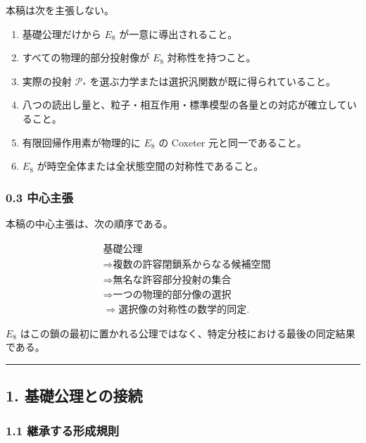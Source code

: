 \documentclass[
  a4paper,
  ja=minimal,
  xelatex,
  paragraph-mark={},
]{bxjsarticle}
\providecommand{\tightlist}{%
  \setlength{\itemsep}{0pt}\setlength{\parskip}{0pt}}
\begin{document}
本稿は次を主張しない。

\begin{enumerate}
\def\labelenumi{\arabic{enumi}.}
\tightlist
\item
  基礎公理だけから \(E_8\) が一意に導出されること。
\item
  すべての物理的部分投射像が \(E_8\) 対称性を持つこと。
\item
  実際の投射 \(\mathcal P_*\)
  を選ぶ力学または選択汎関数が既に得られていること。
\item
  八つの読出し量と、粒子・相互作用・標準模型の各量との対応が確立していること。
\item
  有限回帰作用素が物理的に \(E_8\) の Coxeter 元と同一であること。
\item
  \(E_8\) が時空全体または全状態空間の対称性であること。
\end{enumerate}

\subsubsection{0.3 中心主張}\label{ux4e2dux5fc3ux4e3bux5f35}

本稿の中心主張は、次の順序である。

\[
\boxed{
\begin{aligned}
&\text{基礎公理}\\
&\Longrightarrow
\text{複数の許容閉鎖系からなる候補空間}\\
&\Longrightarrow
\text{無名な許容部分投射の集合}\\
&\Longrightarrow
\text{一つの物理的部分像の選択}\\
&\Longrightarrow
\text{選択像の対称性の数学的同定}.
\end{aligned}
}
\]

\(E_8\)
はこの鎖の最初に置かれる公理ではなく、特定分枝における最後の同定結果である。

\begin{center}\rule{0.5\linewidth}{0.5pt}\end{center}

\subsection{1.
基礎公理との接続}\label{ux57faux790eux516cux7406ux3068ux306eux63a5ux7d9a}

\subsubsection{1.1
継承する形成規則}\label{ux7d99ux627fux3059ux308bux5f62ux6210ux898fux5247}
\end{document}
